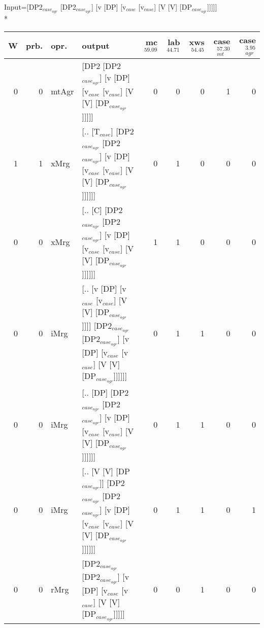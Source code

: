 \begingroup\scriptsize Input=[DP2$_{case_{agr}}$ [DP2$_{case_{agr}}$] [v [DP] [v$_{case}$ [v$_{case}$] [V [V] [DP$_{case_{agr}}$]]]]]\\*
\begin{tabularx}{\linewidth}{rrlXrrrrr}
\hline
   W &   prb. & opr.    & output                                                                                                                               &   mc$^{59.09}$ &   lab$^{44.71}$ &   xws$^{54.45}$ &   case$_{mt}^{57.30}$ &   case$_{agr}^{3.95}$ \\
\hline
   0 &   0 & mtAgr & [DP2 [DP2$_{case_{agr}}$] [v [DP] [v$_{case}$ [v$_{case}$] [V [V] [DP$_{case_{agr}}$]]]]]                                                                &            0 &             0 &             0 &                 1 &                  0 \\
   1 &   1 & xMrg  & [.. [T$_{case}$] [DP2$_{case_{agr}}$ [DP2$_{case_{agr}}$] [v [DP] [v$_{case}$ [v$_{case}$] [V [V] [DP$_{case_{agr}}$]]]]]]                                         &            0 &             1 &             0 &                 0 &                  0 \\
   0 &   0 & xMrg  & [.. [C] [DP2$_{case_{agr}}$ [DP2$_{case_{agr}}$] [v [DP] [v$_{case}$ [v$_{case}$] [V [V] [DP$_{case_{agr}}$]]]]]]                                              &            1 &             1 &             0 &                 0 &                  0 \\
   0 &   0 & iMrg  & [.. [v [DP] [v$_{case}$ [v$_{case}$] [V [V] [DP$_{case_{agr}}$]]]] [DP2$_{case_{agr}}$ [DP2$_{case_{agr}}$] [v [DP] [v$_{case}$ [v$_{case}$] [V [V] [DP$_{case_{agr}}$]]]]]] &            0 &             1 &             1 &                 0 &                  0 \\
   0 &   0 & iMrg  & [.. [DP] [DP2$_{case_{agr}}$ [DP2$_{case_{agr}}$] [v [DP] [v$_{case}$ [v$_{case}$] [V [V] [DP$_{case_{agr}}$]]]]]]                                             &            0 &             1 &             1 &                 0 &                  0 \\
   0 &   0 & iMrg  & [.. [V [V] [DP$_{case_{agr}}$]] [DP2$_{case_{agr}}$ [DP2$_{case_{agr}}$] [v [DP] [v$_{case}$ [v$_{case}$] [V [V] [DP$_{case_{agr}}$]]]]]]                            &            0 &             1 &             1 &                 0 &                  1 \\
   0 &   0 & rMrg  & [DP2$_{case_{agr}}$ [DP2$_{case_{agr}}$] [v [DP] [v$_{case}$ [v$_{case}$] [V [V] [DP$_{case_{agr}}$]]]]]                                                       &            0 &             0 &             1 &                 0 &                  0 \\
\hline
\end{tabularx}\endgroup\\
